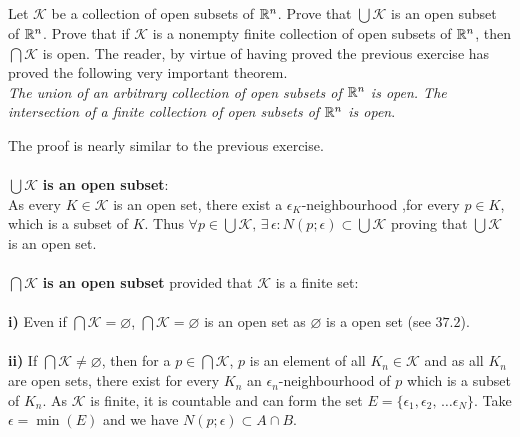 \subsection{}
\begin{tcolorbox}
Let $\mathscr{K}$ be a collection of open subsets of $\mathbb{R}^n$. Prove that $\bigcup\mathscr{K}$ is an open subset of $\mathbb{R}^n$. Prove that if $\mathscr{K}$ is a nonempty finite
collection of open subsets of $\mathbb{R}^n$, then $\bigcap \mathscr{K}$ is open.
The reader, by virtue of having proved the previous exercise
has proved the following very important theorem. \\
\textit{The union of an arbitrary collection of open subsets of $\mathbb{R}^n$ is open. The intersection of a finite collection of open subsets of $\mathbb{R}^n$ is open}.
\end{tcolorbox}
The proof is nearly similar to the previous exercise.\\\\
$\bigcup\mathscr{K}$ \textbf{is an open subset}:\\
As every $K\in\mathscr{K}$ is an open set, there exist a $\epsilon_K$-neighbourhood ,for every $p\in K$, which is a subset of $K$. Thus $\forall p\in \bigcup\mathscr{K},\, \exists\, \epsilon: N(p;\epsilon)\subset \bigcup\mathscr{K}$ proving that $\bigcup\mathscr{K}$ is an open set.\\\\
$\bigcap\mathscr{K}$ \textbf{is an open subset} provided that $\mathscr{K}$ is a finite set:\\\\
\textbf{i)} Even if $\bigcap\mathscr{K}=\varnothing$, $\bigcap\mathscr{K}=\varnothing$ is an open set as $\varnothing$ is a open set (see $\mathbf{37.2}$).\\\\
\textbf{ii) }If  $\bigcap\mathscr{K}\neq\varnothing$,  then for a $p\in  \bigcap\mathscr{K}$,  $p$ is an element of all $K_n\in \mathscr{K}$ and as all $K_n$ are open sets, there exist for every $K_n$ an  $\epsilon_n$-neighbourhood of $p$ which is a subset of $K_n$. As $\mathscr{K}$ is finite, it is countable and can form the set $E=\{\epsilon_1,\epsilon_2,\, \dots \epsilon_N\}$. Take $\epsilon = \min (E)$ and we have $N(p;\epsilon)\subset A\cap B$.\\\\

